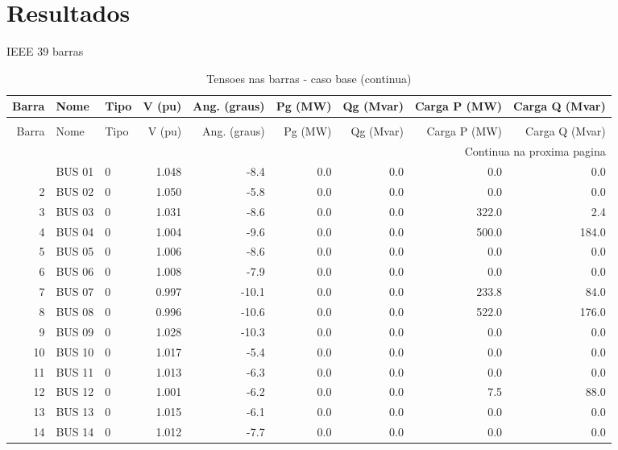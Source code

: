 \documentclass[12pt]{classe_uftex/uftex}
\begin{document}
\pagestyle{plain}
\chapter*{Resultados}

\begin{center}
    IEEE 39 barras
\end{center}

\scriptsize
\begin{longtable}{rllrrrrrr}
\caption{Tensoes nas barras - caso base}\label{tab:tensoes-base}\\
\toprule
Barra & Nome & Tipo & V (pu) & Ang. (graus) & Pg (MW) & Qg (Mvar) & Carga P (MW) & Carga Q (Mvar) \\
\midrule
\endfirsthead
\caption[]{Tensoes nas barras - caso base (continua)}\\
\toprule
Barra & Nome & Tipo & V (pu) & Ang. (graus) & Pg (MW) & Qg (Mvar) & Carga P (MW) & Carga Q (Mvar) \\
\midrule
\endhead
\midrule
\multicolumn{9}{r}{Continua na proxima pagina}\\
\endfoot
\bottomrule
\endlastfoot
1 & BUS 01 & 0 & 1.048 & -8.4 & 0.0 & 0.0 & 0.0 & 0.0 \\
2 & BUS 02 & 0 & 1.050 & -5.8 & 0.0 & 0.0 & 0.0 & 0.0 \\
3 & BUS 03 & 0 & 1.031 & -8.6 & 0.0 & 0.0 & 322.0 & 2.4 \\
4 & BUS 04 & 0 & 1.004 & -9.6 & 0.0 & 0.0 & 500.0 & 184.0 \\
5 & BUS 05 & 0 & 1.006 & -8.6 & 0.0 & 0.0 & 0.0 & 0.0 \\
6 & BUS 06 & 0 & 1.008 & -7.9 & 0.0 & 0.0 & 0.0 & 0.0 \\
7 & BUS 07 & 0 & 0.997 & -10.1 & 0.0 & 0.0 & 233.8 & 84.0 \\
8 & BUS 08 & 0 & 0.996 & -10.6 & 0.0 & 0.0 & 522.0 & 176.0 \\
9 & BUS 09 & 0 & 1.028 & -10.3 & 0.0 & 0.0 & 0.0 & 0.0 \\
10 & BUS 10 & 0 & 1.017 & -5.4 & 0.0 & 0.0 & 0.0 & 0.0 \\
11 & BUS 11 & 0 & 1.013 & -6.3 & 0.0 & 0.0 & 0.0 & 0.0 \\
12 & BUS 12 & 0 & 1.001 & -6.2 & 0.0 & 0.0 & 7.5 & 88.0 \\
13 & BUS 13 & 0 & 1.015 & -6.1 & 0.0 & 0.0 & 0.0 & 0.0 \\
14 & BUS 14 & 0 & 1.012 & -7.7 & 0.0 & 0.0 & 0.0 & 0.0 \\

\end{longtable}
\end{document}
